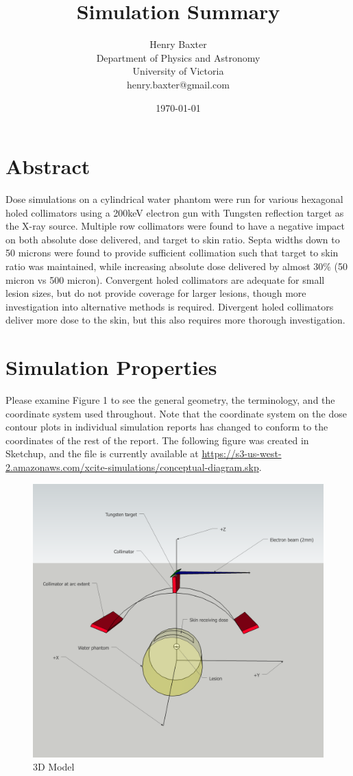 \documentclass[12pt]{article}
\title{Simulation Summary}
\author{
        Henry Baxter \\
                Department of Physics and Astronomy\\
        University of Victoria\\
        henry.baxter@gmail.com
}
\date{\today}
\begin{document}
\maketitle

\section*{Abstract}

Dose simulations on a cylindrical water phantom were run for various hexagonal holed collimators using a 200keV electron gun with Tungsten reflection target as the X-ray source. Multiple row collimators were found to have a negative impact on both absolute dose delivered, and target to skin ratio. Septa widths down to 50 microns were found to provide sufficient collimation such that target to skin ratio was maintained, while increasing absolute dose delivered by almost 30\% (50 micron vs 500 micron). Convergent holed collimators are adequate for small lesion sizes, but do not provide coverage for larger lesions, though more investigation into alternative methods is required. Divergent holed collimators deliver more dose to the skin, but this also requires more thorough investigation.

\section*{Simulation Properties}

Please examine Figure 1 to see the general geometry, the terminology, and the coordinate system used throughout. Note that the coordinate system on the dose contour plots in individual simulation reports has changed to conform to the coordinates of the rest of the report. The following figure was created in Sketchup, and the file is currently available at \url{https://s3-us-west-2.amazonaws.com/xcite-simulations/conceptual-diagram.skp}.

\begin{figure}[H]
\centering
\includegraphics[scale=0.3]{../conceptual-diagram.png}
\caption{3D Model}
\end{figure}
\end{document}
